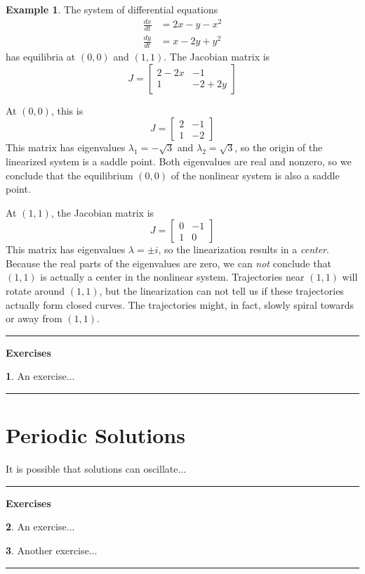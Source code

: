 \documentclass[reqno]{immbook}
\numberwithin{equation}{chapter}
\numberwithin{question}{section}
\numberwithin{theorem}{chapter}
\numberwithin{figure}{chapter}
\theoremstyle{definition}
\newtheorem{exercise}{}[section]
\newtheorem{example}{Example}[section]
\newenvironment{exercises}%
{%
\medskip\hrule\medskip\noindent\textbf{Exercises}%
}%
{%
\medskip\hrule
}
\begin{document}
\begin{example}
The system of differential equations
\begin{equation}
\begin{split}
  \frac{dx}{dt} & = 2x - y -x^2 \\
  \frac{dy}{dt} & = x - 2y + y^2
\end{split}
\end{equation}
has equilibria at $(0,0)$ and $(1,1)$.
The Jacobian matrix is
\begin{equation}
  J = \begin{bmatrix}
           2-2x & -1 \\
	   1 & -2 + 2y
      \end{bmatrix}
\end{equation}

At $(0,0)$, this is
\begin{equation}
  J = \begin{bmatrix}
           2 & -1 \\
	   1 & -2
      \end{bmatrix}
\end{equation}
This matrix has eigenvalues $\lambda_1 = -\sqrt{3}$ 
and $\lambda_2 = \sqrt{3}$, so the
origin of the  linearized system is a saddle point.
Both eigenvalues are real and nonzero,
so we conclude that the equilibrium
$(0,0)$ of the nonlinear system is also a saddle point.

At $(1,1)$, the Jacobian matrix is
\begin{equation}
  J = \begin{bmatrix}
           0 & -1 \\
	   1 & 0
      \end{bmatrix}
\end{equation}
This matrix has eigenvalues $\lambda=\pm i$,
so the linearization results in a \emph{center}.
Because the real parts of the eigenvalues are
zero, we can \emph{not} conclude that $(1,1)$
is actually a center in the nonlinear system.
Trajectories near $(1,1)$ will rotate around $(1,1)$, but
the linearization can not tell us if these trajectories
actually form closed curves.
The trajectories might, in fact, slowly spiral
towards or away from $(1,1)$.
\end{example}
%
\begin{exercises}
\begin{exercise}
An exercise...
\end{exercise}
\end{exercises}
%
\section{Periodic Solutions}
It is possible that solutions can oscillate...
\begin{exercises}
\begin{exercise}
An exercise...
\end{exercise}
\begin{exercise}
Another exercise...
\end{exercise}
\end{exercises}
\end{document}
